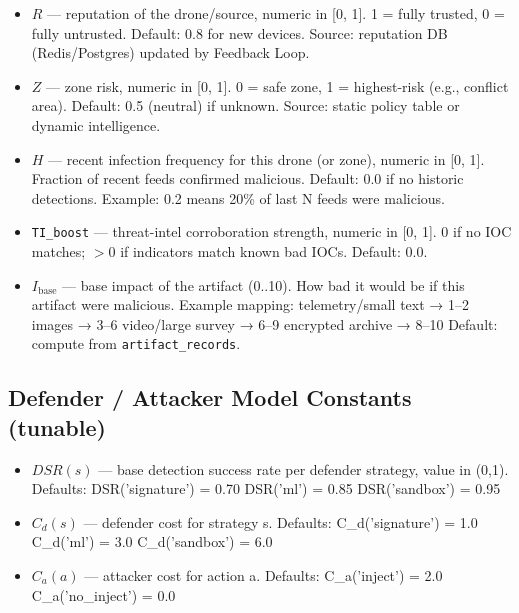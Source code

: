 \documentclass[12pt, a4paper]{report}
\begin{document}
\begin{itemize}
    \item $R$ — reputation of the drone/source, numeric in [0, 1].  
    1 = fully trusted, 0 = fully untrusted.  
    Default: 0.8 for new devices.  
    Source: reputation DB (Redis/Postgres) updated by Feedback Loop.

    \item $Z$ — zone risk, numeric in [0, 1].  
    0 = safe zone, 1 = highest-risk (e.g., conflict area).  
    Default: 0.5 (neutral) if unknown.  
    Source: static policy table or dynamic intelligence.

    \item $H$ — recent infection frequency for this drone (or zone), numeric in [0, 1].  
    Fraction of recent feeds confirmed malicious.  
    Default: 0.0 if no historic detections.  
    Example: 0.2 means 20\% of last N feeds were malicious.

    \item \texttt{TI\_boost} — threat-intel corroboration strength, numeric in [0, 1].  
    0 if no IOC matches; \(>0\) if indicators match known bad IOCs.  
    Default: 0.0.

    \item $I_{\text{base}}$ — base impact of the artifact (0..10).  
    How bad it would be if this artifact were malicious.  
    Example mapping:  
    telemetry/small text → 1–2  
    images → 3–6  
    video/large survey → 6–9  
    encrypted archive → 8–10  
    Default: compute from \texttt{artifact\_records}.
\end{itemize}

\subsection*{Defender / Attacker Model Constants (tunable)}

\begin{itemize}
    \item $DSR(s)$ — base detection success rate per defender strategy, value in (0,1).  
    Defaults:  
    DSR('signature') = 0.70  
    DSR('ml') = 0.85  
    DSR('sandbox') = 0.95

    \item $C_d(s)$ — defender cost for strategy s.  
    Defaults:  
    C\_d('signature') = 1.0  
    C\_d('ml') = 3.0  
    C\_d('sandbox') = 6.0

    \item $C_a(a)$ — attacker cost for action a.  
    Defaults:  
    C\_a('inject') = 2.0  
    C\_a('no\_inject') = 0.0
\end{itemize}
\end{document}
